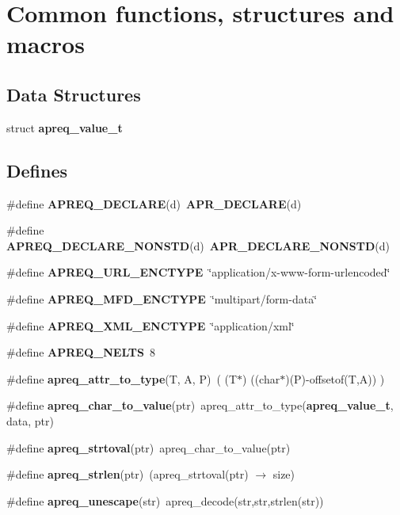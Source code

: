 \section{Common functions, structures and macros}
\label{group__Utils}
\subsection*{Data Structures}
\begin{CompactItemize}
\item 
struct {\bf apreq\_\-value\_\-t}
\end{CompactItemize}
\subsection*{Defines}
\begin{CompactItemize}
\item 
\#define {\bf APREQ\_\-DECLARE}(d)\ {\bf APR\_\-DECLARE}(d)\label{group__Utils_a23}

\item 
\#define {\bf APREQ\_\-DECLARE\_\-NONSTD}(d)\ {\bf APR\_\-DECLARE\_\-NONSTD}(d)\label{group__Utils_a24}

\item 
\#define {\bf APREQ\_\-URL\_\-ENCTYPE}\ \char`\"{}application/x-www-form-urlencoded\char`\"{}\label{group__Utils_a25}

\item 
\#define {\bf APREQ\_\-MFD\_\-ENCTYPE}\ \char`\"{}multipart/form-data\char`\"{}\label{group__Utils_a26}

\item 
\#define {\bf APREQ\_\-XML\_\-ENCTYPE}\ \char`\"{}application/xml\char`\"{}\label{group__Utils_a27}

\item 
\#define {\bf APREQ\_\-NELTS}\ 8\label{group__Utils_a28}

\item 
\#define {\bf apreq\_\-attr\_\-to\_\-type}(T, A, P)\ ( (T$\ast$) ((char$\ast$)(P)-offsetof(T,A)) )\label{group__Utils_a29}

\item 
\#define {\bf apreq\_\-char\_\-to\_\-value}(ptr)\ apreq\_\-attr\_\-to\_\-type({\bf apreq\_\-value\_\-t}, data, ptr)\label{group__Utils_a30}

\item 
\#define {\bf apreq\_\-strtoval}(ptr)\ apreq\_\-char\_\-to\_\-value(ptr)\label{group__Utils_a31}

\item 
\#define {\bf apreq\_\-strlen}(ptr)\ (apreq\_\-strtoval(ptr) $\rightarrow$ size)\label{group__Utils_a32}

\item 
\#define {\bf apreq\_\-unescape}(str)\ apreq\_\-decode(str,str,strlen(str))\label{group__Utils_a33}

\end{CompactItemize}
